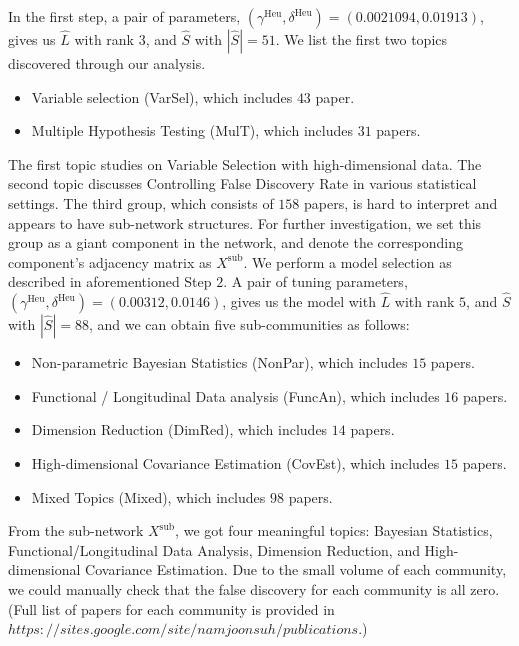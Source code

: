 \documentclass[AMS,STIX1COL]{WileyNJD-v2}
\begin{document}
{In the first step, a pair of parameters, $(\gamma^{\text{Heu}},\delta^{\text{Heu}}) = (0.0021094, 0.01913)$, gives us $\widehat{L}$ with rank $3$, and $\widehat{S}$ with $|\widehat{S}|=51$.
We list the first two topics discovered through our analysis.
\begin{itemize}
    \item Variable selection (VarSel), which includes $43$ paper.
    \item Multiple Hypothesis Testing (MulT), which includes $31$ papers.
\end{itemize}
The first topic studies on Variable Selection with high-dimensional data.
The second topic discusses Controlling False Discovery Rate in various statistical settings.
The third group, which consists of $158$ papers, is hard to interpret and appears to have sub-network structures.
For further investigation, we set this group as a giant component in the network, and denote the corresponding component's adjacency matrix as $X^{\mbox{sub}}$.
We perform a model selection as described in aforementioned Step $2$.
A pair of tuning parameters, $(\gamma^{\text{Heu}},\delta^{\text{Heu}}) = (0.00312, 0.0146)$, gives us the model with $\widehat{L}$ with rank $5$, and $\widehat{S}$ with $|\widehat{S}|=88$,
and we can obtain five sub-communities as follows:
\begin{itemize}
    \item Non-parametric Bayesian Statistics (NonPar), which includes $15$ papers.
    \item Functional / Longitudinal Data analysis (FuncAn), which includes $16$ papers.
    \item Dimension Reduction (DimRed), which includes $14$ papers.
    \item High-dimensional Covariance Estimation (CovEst), which includes $15$ papers.
    \item Mixed Topics (Mixed), which includes $98$ papers.
\end{itemize}
From the sub-network $X^{\mbox{sub}}$, we got four meaningful topics: Bayesian Statistics, Functional/Longitudinal Data Analysis, Dimension Reduction, and High-dimensional Covariance Estimation.
Due to the small volume of each community, we could manually check that the false discovery for each community is all zero.
(Full list of papers for each community is provided in $https://sites.google.com/site/namjoonsuh/publications$.)

}
\end{document}
